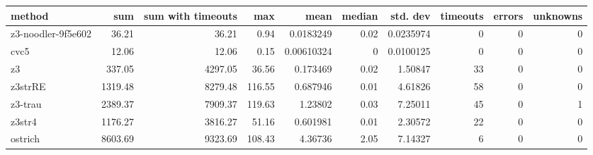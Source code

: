 \begin{tabular}{lrrrrrrrrr}
\hline
 method             &     sum &   sum with timeouts &    max &       mean &   median &   std. dev &   timeouts &   errors &   unknowns \\
\hline
 z3-noodler-9f5e602 &   36.21 &               36.21 &   0.94 & 0.0183249  &     0.02 &  0.0235974 &          0 &        0 &          0 \\
 cvc5               &   12.06 &               12.06 &   0.15 & 0.00610324 &     0    &  0.0100125 &          0 &        0 &          0 \\
 z3                 &  337.05 &             4297.05 &  36.56 & 0.173469   &     0.02 &  1.50847   &         33 &        0 &          0 \\
 z3strRE            & 1319.48 &             8279.48 & 116.55 & 0.687946   &     0.01 &  4.61826   &         58 &        0 &          0 \\
 z3-trau            & 2389.37 &             7909.37 & 119.63 & 1.23802    &     0.03 &  7.25011   &         45 &        0 &          1 \\
 z3str4             & 1176.27 &             3816.27 &  51.16 & 0.601981   &     0.01 &  2.30572   &         22 &        0 &          0 \\
 ostrich            & 8603.69 &             9323.69 & 108.43 & 4.36736    &     2.05 &  7.14327   &          6 &        0 &          0 \\
\hline
\end{tabular}
